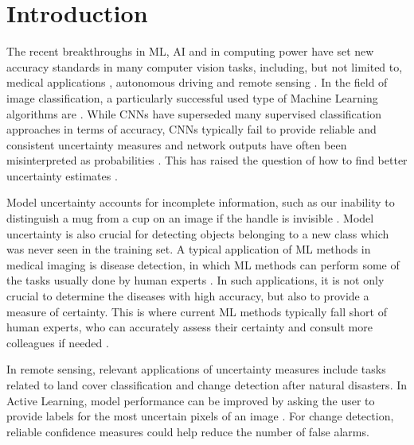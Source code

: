 \documentclass[10pt]{article}
\begin{document}
\setcounter{page}{1}

\section{Introduction}
The recent breakthroughs in \gls{ML}, \gls{AI} and in computing power have set new accuracy standards in many computer vision tasks, including, but not limited to, medical applications \cite{leibig2017, ronneberger2015u}, autonomous driving \cite{Levinson2011TowardsFA} and remote sensing \cite{Volpi2017DenseSL, kampffmeyer, Zhu2017DeepLI, Shelhamer2015FullyCN}. In the field of image classification, a particularly successful used type of Machine Learning algorithms are . While \glspl{CNN} have superseded many supervised classification approaches in terms of accuracy, \glspl{CNN} typically fail to provide reliable and consistent uncertainty measures and network outputs have often been misinterpreted as probabilities \cite{NguyenYC14, Goodfellow2014}. This has raised the question of how to find better uncertainty estimates \cite{KendallG17, Gal2016Uncertainty}.

Model uncertainty accounts for incomplete information, such as our inability to distinguish a mug from a cup on an image if the handle is invisible \cite{Rupprecht2017LearningIA}. Model uncertainty is also crucial for detecting objects belonging to a new class which was never seen in the training set. A typical application of \gls{ML} methods in medical imaging is disease detection, in which \gls{ML} methods can perform some of the tasks usually done by human experts \cite{leibig2017}. In such applications, it is not only crucial to determine the diseases with high accuracy, but also to provide a measure of certainty. This is where current \gls{ML} methods typically fall short of human experts, who can accurately assess their certainty and consult more colleagues if needed \cite{leibig2017}.

In remote sensing, relevant applications of uncertainty measures include tasks related to land cover classification and change detection after natural disasters. In Active Learning, model performance can be improved by asking the user to provide labels for the most uncertain pixels of an image \cite{menderes_automatic_2015, womble_automated_2007, postadjian_investigating_2017, tuiaAL2011, Tuia2011ASO}. For change detection, reliable confidence measures could help reduce the number of false alarms.
\end{document}
